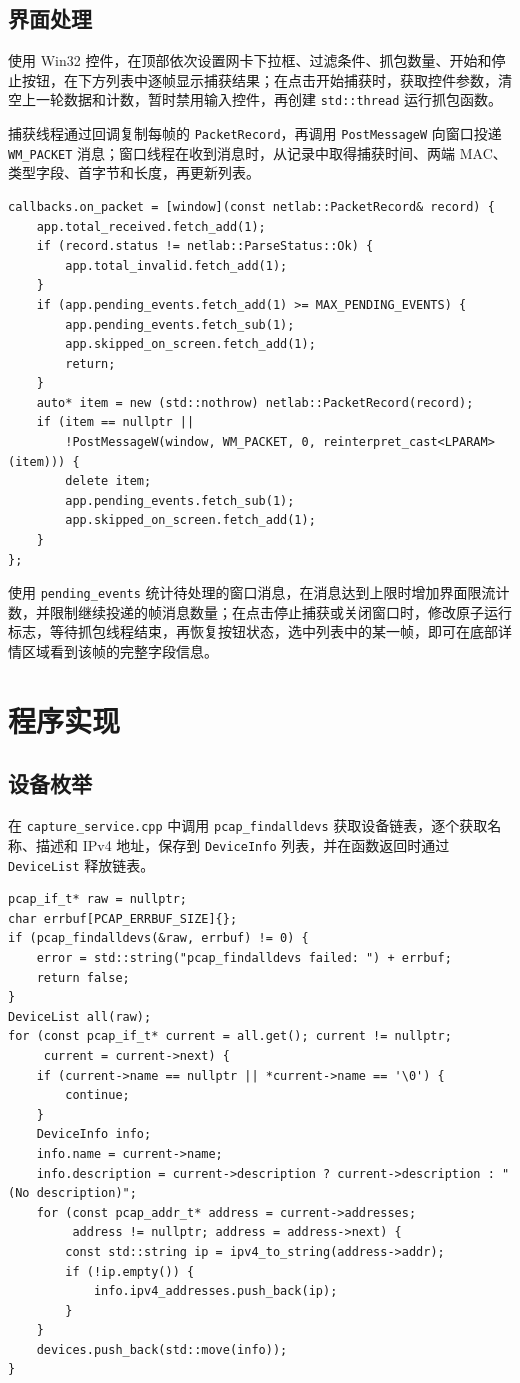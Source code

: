 \documentclass[UTF8,a4paper,11pt,scheme=chinese]{ctexart}
\newcommand{\code}[1]{\texttt{#1}}
\begin{document}
\subsection{界面处理}
使用 Win32 控件，在顶部依次设置网卡下拉框、过滤条件、抓包数量、开始和停止按钮，在下方列表中逐帧显示捕获结果；在点击开始捕获时，获取控件参数，清空上一轮数据和计数，暂时禁用输入控件，再创建 \code{std::thread} 运行抓包函数。

捕获线程通过回调复制每帧的 \code{PacketRecord}，再调用 \code{PostMessageW} 向窗口投递 \code{WM\_PACKET} 消息；窗口线程在收到消息时，从记录中取得捕获时间、两端 MAC、类型字段、首字节和长度，再更新列表。
\begin{lstlisting}
callbacks.on_packet = [window](const netlab::PacketRecord& record) {
    app.total_received.fetch_add(1);
    if (record.status != netlab::ParseStatus::Ok) {
        app.total_invalid.fetch_add(1);
    }
    if (app.pending_events.fetch_add(1) >= MAX_PENDING_EVENTS) {
        app.pending_events.fetch_sub(1);
        app.skipped_on_screen.fetch_add(1);
        return;
    }
    auto* item = new (std::nothrow) netlab::PacketRecord(record);
    if (item == nullptr ||
        !PostMessageW(window, WM_PACKET, 0, reinterpret_cast<LPARAM>(item))) {
        delete item;
        app.pending_events.fetch_sub(1);
        app.skipped_on_screen.fetch_add(1);
    }
};
\end{lstlisting}

使用 \code{pending\_events} 统计待处理的窗口消息，在消息达到上限时增加界面限流计数，并限制继续投递的帧消息数量；在点击停止捕获或关闭窗口时，修改原子运行标志，等待抓包线程结束，再恢复按钮状态，选中列表中的某一帧，即可在底部详情区域看到该帧的完整字段信息。

\section{程序实现}
\subsection{设备枚举}
在 \code{capture\_service.cpp} 中调用 \code{pcap\_findalldevs} 获取设备链表，逐个获取名称、描述和 IPv4 地址，保存到 \code{DeviceInfo} 列表，并在函数返回时通过 \code{DeviceList} 释放链表。
\begin{lstlisting}
pcap_if_t* raw = nullptr;
char errbuf[PCAP_ERRBUF_SIZE]{};
if (pcap_findalldevs(&raw, errbuf) != 0) {
    error = std::string("pcap_findalldevs failed: ") + errbuf;
    return false;
}
DeviceList all(raw);
for (const pcap_if_t* current = all.get(); current != nullptr;
     current = current->next) {
    if (current->name == nullptr || *current->name == '\0') {
        continue;
    }
    DeviceInfo info;
    info.name = current->name;
    info.description = current->description ? current->description : "(No description)";
    for (const pcap_addr_t* address = current->addresses;
         address != nullptr; address = address->next) {
        const std::string ip = ipv4_to_string(address->addr);
        if (!ip.empty()) {
            info.ipv4_addresses.push_back(ip);
        }
    }
    devices.push_back(std::move(info));
}
\end{lstlisting}
\end{document}

